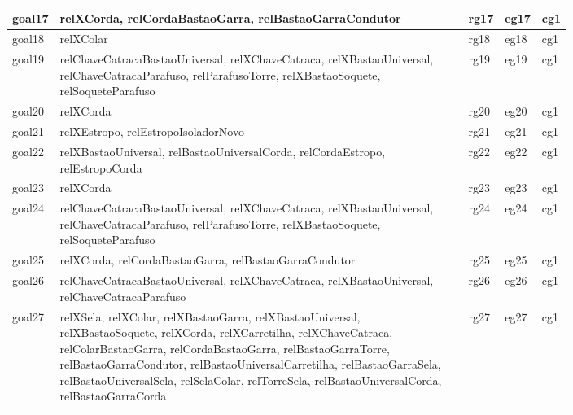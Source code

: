 \documentclass[12pt]{article}
\begin{document}
\begin{table}[H]
\begin{tabular}{|l|p{0.8\linewidth}|l|l|l|}
goal17 & relXCorda, relCordaBastaoGarra, relBastaoGarraCondutor & rg17 & eg17 & cg1 \\ \hline
goal18 & relXColar & rg18 & eg18 & cg1 \\ \hline
goal19 & relChaveCatracaBastaoUniversal, relXChaveCatraca, relXBastaoUniversal, relChaveCatracaParafuso, relParafusoTorre, relXBastaoSoquete, relSoqueteParafuso & rg19 & eg19 & cg1 \\ \hline
goal20 & relXCorda & rg20 & eg20 & cg1 \\ \hline
goal21 & relXEstropo, relEstropoIsoladorNovo & rg21 & eg21 & cg1 \\ \hline
goal22 & relXBastaoUniversal, relBastaoUniversalCorda, relCordaEstropo, relEstropoCorda & rg22 & eg22 & cg1 \\ \hline
goal23 & relXCorda & rg23 & eg23 & cg1 \\ \hline
goal24 & relChaveCatracaBastaoUniversal, relXChaveCatraca, relXBastaoUniversal, relChaveCatracaParafuso, relParafusoTorre, relXBastaoSoquete, relSoqueteParafuso & rg24 & eg24 & cg1 \\ \hline
goal25 & relXCorda, relCordaBastaoGarra, relBastaoGarraCondutor & rg25 & eg25 & cg1 \\ \hline
goal26 & relChaveCatracaBastaoUniversal, relXChaveCatraca, relXBastaoUniversal, relChaveCatracaParafuso & rg26 & eg26 & cg1 \\ \hline
goal27 & relXSela, relXColar, relXBastaoGarra, relXBastaoUniversal, relXBastaoSoquete, relXCorda, relXCarretilha, relXChaveCatraca, relColarBastaoGarra, relCordaBastaoGarra, relBastaoGarraTorre, relBastaoGarraCondutor, relBastaoUniversalCarretilha, relBastaoGarraSela, relBastaoUniversalSela, relSelaColar, relTorreSela, relBastaoUniversalCorda, relBastaoGarraCorda & rg27 & eg27 & cg1 \\ \hline
\end{tabular}
\end{table}




\end{document}
